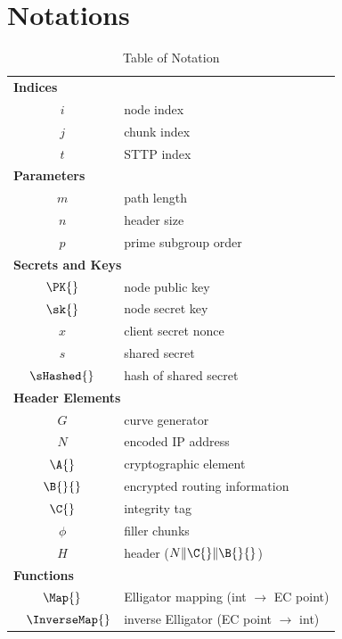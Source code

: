 
\section{Notations}

\label{app:table_notation}
\begin{table}[h]
    \caption{Table of Notation}
    \centering
    \begin{tabular}{c l}
        \toprule
        \multicolumn{2}{l}{\textbf{Indices}}\\
        $i$          & node index \\
        $j$          & chunk index \\
        $t$          & STTP index \\[2pt]

        \multicolumn{2}{l}{\textbf{Parameters}}\\
        $m$          & path length \\
        $n$          & header size \\
        $p$          & prime subgroup order \\[2pt]
        
        \multicolumn{2}{l}{\textbf{Secrets and Keys}}\\
        $\PK{}$      & node public key \\
        $\sk{}$      & node secret key \\
        $x$          & client secret nonce \\
        $s$          & shared secret \\
        $\sHashed{}$ & hash of shared secret \\[2pt]

        \multicolumn{2}{l}{\textbf{Header Elements}}\\
        $G$          & curve generator \\
        $N$	         & encoded IP address \\
        $\A{}$       & cryptographic element \\
        $\B{}{}$     & encrypted routing information \\
        $\C{}$       & integrity tag \\
        $\phi$       & filler chunks \\
        $H$          & header ($N \| \C{} \| \B{}{}$) \\[2pt]

        \multicolumn{2}{l}{\textbf{Functions}}\\
        $\Map{}$         & Elligator mapping (int $\rightarrow$ EC point) \\
        $\hspace{3.5mm}\InverseMap{}$  & inverse Elligator (EC point $\rightarrow$ int) \\
        \bottomrule
    \end{tabular}
\end{table}
